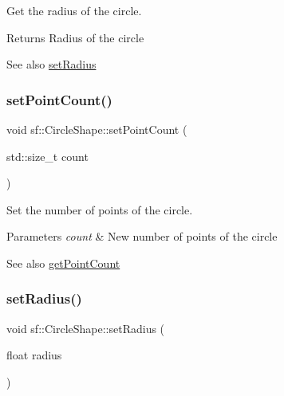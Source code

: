 Get the radius of the circle. 

\begin{DoxyReturn}{Returns}
Radius of the circle
\end{DoxyReturn}
\begin{DoxySeeAlso}{See also}
\hyperlink{classsf_1_1_circle_shape_a21cdf85fc2f201e10222a241af864be0}{set\+Radius} 
\end{DoxySeeAlso}
\mbox{\label{classsf_1_1_circle_shape_a16590ee7bdf5c9f752275468a4997bed}} 
\subsubsection{\texorpdfstring{set\+Point\+Count()}{setPointCount()}}
{\footnotesize\ttfamily void sf\+::\+Circle\+Shape\+::set\+Point\+Count (\begin{DoxyParamCaption}\item[{std\+::size\+\_\+t}]{count }\end{DoxyParamCaption})}



Set the number of points of the circle. 


\begin{DoxyParams}{Parameters}
{\em count} & New number of points of the circle\\
\hline
\end{DoxyParams}
\begin{DoxySeeAlso}{See also}
\hyperlink{classsf_1_1_circle_shape_a014d29ec11e8afa4dce50e7047d99601}{get\+Point\+Count} 
\end{DoxySeeAlso}
\mbox{\label{classsf_1_1_circle_shape_a21cdf85fc2f201e10222a241af864be0}} 
\subsubsection{\texorpdfstring{set\+Radius()}{setRadius()}}
{\footnotesize\ttfamily void sf\+::\+Circle\+Shape\+::set\+Radius (\begin{DoxyParamCaption}\item[{float}]{radius }\end{DoxyParamCaption})}



